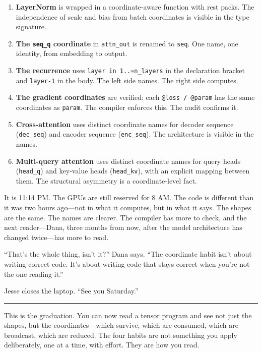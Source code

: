 \documentclass[11pt,]{article}
\begin{document}
\begin{enumerate}
\def\labelenumi{\arabic{enumi}.}
\item
  \textbf{LayerNorm} is wrapped in a coordinate-aware function with rest
  packs. The independence of scale and bias from batch coordinates is
  visible in the type signature.
\item
  \textbf{The \texttt{seq\_q} coordinate} in \texttt{attn\_out} is
  renamed to \texttt{seq}. One name, one identity, from embedding to
  output.
\item
  \textbf{The recurrence} uses \texttt{layer\ in\ 1..=n\_layers} in the
  declaration bracket and \texttt{layer-1} in the body. The left side
  names. The right side computes.
\item
  \textbf{The gradient coordinates} are verified: each
  \texttt{@loss\ /\ @param} has the same coordinates as \texttt{param}.
  The compiler enforces this. The audit confirms it.
\item
  \textbf{Cross-attention} uses distinct coordinate names for decoder
  sequence (\texttt{dec\_seq}) and encoder sequence (\texttt{enc\_seq}).
  The architecture is visible in the names.
\item
  \textbf{Multi-query attention} uses distinct coordinate names for
  query heads (\texttt{head\_q}) and key-value heads
  (\texttt{head\_kv}), with an explicit mapping between them. The
  structural asymmetry is a coordinate-level fact.
\end{enumerate}

It is 11:14 PM. The GPUs are still reserved for 8 AM. The code is
different than it was two hours ago---not in what it computes, but in
what it says. The shapes are the same. The names are clearer. The
compiler has more to check, and the next reader---Dana, three months
from now, after the model architecture has changed twice---has more to
read.

``That's the whole thing, isn't it?'' Dana says. ``The coordinate habit
isn't about writing correct code. It's about writing code that stays
correct when you're not the one reading it.''

Jesse closes the laptop. ``See you Saturday.''

\begin{center}\rule{0.5\linewidth}{0.4pt}\end{center}

This is the graduation. You can now read a tensor program and see not
just the shapes, but the coordinates---which survive, which are
consumed, which are broadcast, which are reduced. The four habits are
not something you apply deliberately, one at a time, with effort. They
are how you read.
\end{document}
